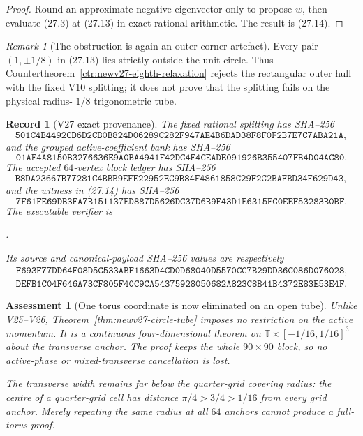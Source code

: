 \documentclass[11pt,oneside]{article}
\newtheorem{assessment}[theorem]{Assessment}
\newtheorem{record}[theorem]{Record}
\theoremstyle{definition}
\theoremstyle{remark}
\newtheorem{remark}[theorem]{Remark}
\begin{document}
\begin{proof}
Round an approximate negative eigenvector only to propose \(w\), then
evaluate (27.3) at (27.13) in exact rational arithmetic.  The
result is (27.14).
\end{proof}

\begin{remark}[The obstruction is again an outer-corner artefact]
\label{rem:newv27-physical-arc}
Every pair \((1,\pm1/8)\) in (27.13) lies strictly outside the unit
circle.  Thus Countertheorem~\ref{ctr:newv27-eighth-relaxation}
rejects the rectangular outer hull with the fixed V10 splitting; it
does not prove that the splitting fails on the physical radius-
\(1/8\) trigonometric tube.
\end{remark}

\begin{record}[V27 exact provenance]
\label{rec:newv27-provenance}
The fixed rational splitting has SHA--256
\[
\texttt{501C4B4492CD6D2CB0B824D06289C282F947AE4B6DAD38F8F0F2B7E7C7ABA21A},
                                                               \tag{27.15}
\]
and the grouped active-coefficient bank has SHA--256
\[
\texttt{01AE4A8150B3276636E9A0BA4941F42DC4F4CEADE091926B355407FB4D04AC80}.
                                                               \tag{27.16}
\]
The accepted \(64\)-vertex block ledger has SHA--256
\[
\texttt{B8DA23667B77281C4BBB9EFE22952EC9B84F4861858C29F2C2BAFBD34F629D43},
                                                               \tag{27.17}
\]
and the witness in (27.14) has SHA--256
\[
\texttt{7F61FE69DB3FA7B151137ED887D5626DC37D6B9F43D1E6315FC0EEF53283B0BF}.
                                                               \tag{27.18}
\]
The executable verifier is
\begin{center}
\footnotesize
{}.
\end{center}
Its source and canonical-payload SHA--256 values are respectively
\[
\begin{gathered}
\texttt{F693F77DD64F08D5C533ABF1663D4CD0D68040D5570CC7B29DD36C086D076028},\\
\texttt{DEFB1C04F646A73CF805F40C9CA54375928050682A823C8B41B4372E83E53E4F}.
\end{gathered}                                          \tag{27.19}
\]
\end{record}

\begin{assessment}[One torus coordinate is now eliminated on an open tube]
\label{ass:newv27}
Unlike V25--V26, Theorem~\ref{thm:newv27-circle-tube} imposes no
restriction on the active momentum.  It is a continuous
four-dimensional theorem on
\(\mathbb T\times[-1/16,1/16]^3\) about the transverse anchor.
The proof keeps the whole \(90\times90\) block, so no active-phase or
mixed-transverse cancellation is lost.

The transverse width remains far below the quarter-grid covering
radius: the centre of a quarter-grid cell has distance
\(\pi/4>3/4>1/16\) from every grid anchor.  Merely repeating the
same radius at all \(64\) anchors cannot produce a full-torus proof.
\end{assessment}
\end{document}
